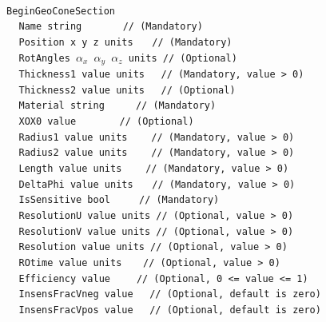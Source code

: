 ~\\
\noindent
{\tt BeginGeoConeSection} \\
$~~~~~${\tt Name             string                   $~~~~~~~~~~~~$   // (Mandatory)} \\
$~~~~~${\tt Position         x  y  z units                     $~~~$   // (Mandatory)} \\
$~~~~~${\tt RotAngles        $\alpha_x$  $\alpha_y$  $\alpha_z$ units  // (Optional)}  \\
$~~~~~${\tt Thickness1       value  units                       $~~$   // (Mandatory, value > 0)} \\
$~~~~~${\tt Thickness2       value  units                       $~~$   // (Optional)} \\
$~~~~~${\tt Material         string                       $~~~~~~~~$   // (Mandatory)} \\
$~~~~~${\tt XOX0             value                   $~~~~~~~~~~~~~$   // (Optional)}  \\
$~~~~~${\tt Radius1          value units                     $~~~~~$   // (Mandatory, value > 0)} \\
$~~~~~${\tt Radius2          value units                     $~~~~~$   // (Mandatory, value > 0)} \\
$~~~~~${\tt Length           value units                     $~~~~~$   // (Mandatory, value > 0)} \\
$~~~~~${\tt DeltaPhi         value units                       $~~~$   // (Mandatory, value > 0)} \\
$~~~~~${\tt IsSensitive      bool                          $~~~~~~~$   // (Mandatory)} \\
$~~~~~${\tt ResolutionU      value units                               // (Optional, value > 0)} \\
$~~~~~${\tt ResolutionV      value units                               // (Optional, value > 0)} \\
$~~~~~${\tt Resolution       value units                               // (Optional, value > 0)} \\
$~~~~~${\tt ROtime           value units                      $~~~~$   // (Optional, value > 0)} \\
$~~~~~${\tt Efficiency       value                          $~~~~~~$   // (Optional, 0 <= value <= 1)} \\
$~~~~~${\tt InsensFracVneg   value                              $~~$   // (Optional, default is zero)} \\
$~~~~~${\tt InsensFracVpos   value                              $~~$   // (Optional, default is zero)} \\
